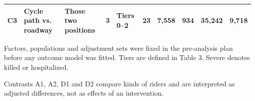 \begin{table}[tp]
\begin{threeparttable}
{\begin{tabular}{lp{3.6cm}p{2.6cm}cp{3.4cm}rrrrr}
C3 & Cycle path vs. roadway & Those two positions & 3 & Tiers 0–2 & 23 & 7,558 & 934 & 35,242 & 9,718 \\
\bottomrule
\end{tabular}}
\begin{tablenotes}[flushleft]\footnotesize
\item Factors, populations and adjustment sets were fixed in the pre-analysis plan before any outcome model was fitted. Tiers are defined in Table 3. Severe denotes killed or hospitalized.
\item Contrasts A1, A2, D1 and D2 compare kinds of riders and are interpreted as adjusted differences, not as effects of an intervention.
\end{tablenotes}
\end{threeparttable}
\end{table}
